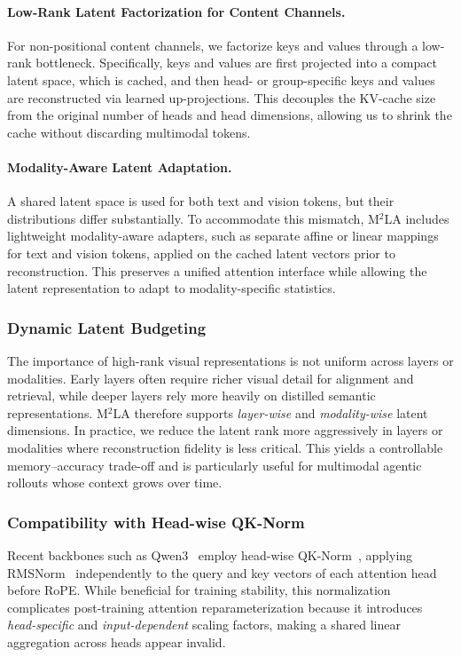 \documentclass[11pt, letterpaper]{template}
\theoremstyle{plain}
\theoremstyle{definition}
\theoremstyle{remark}
\begin{document}
\paragraph{Low-Rank Latent Factorization for Content Channels.}
For non-positional content channels, we factorize keys and values through a low-rank bottleneck. Specifically, keys and values are first projected into a compact latent space, which is cached, and then head- or group-specific keys and values are reconstructed via learned up-projections. This decouples the KV-cache size from the original number of heads and head dimensions, allowing us to shrink the cache without discarding multimodal tokens.

\paragraph{Modality-Aware Latent Adaptation.}
A shared latent space is used for both text and vision tokens, but their distributions differ substantially. To accommodate this mismatch, M$^2$LA includes lightweight modality-aware adapters, such as separate affine or linear mappings for text and vision tokens, applied on the cached latent vectors prior to reconstruction. This preserves a unified attention interface while allowing the latent representation to adapt to modality-specific statistics.

\subsubsection{Dynamic Latent Budgeting}

The importance of high-rank visual representations is not uniform across layers or modalities. Early layers often require richer visual detail for alignment and retrieval, while deeper layers rely more heavily on distilled semantic representations. M$^2$LA therefore supports \emph{layer-wise} and \emph{modality-wise} latent dimensions. In practice, we reduce the latent rank more aggressively in layers or modalities where reconstruction fidelity is less critical. This yields a controllable memory--accuracy trade-off and is particularly useful for multimodal agentic rollouts whose context grows over time.

\subsubsection{Compatibility with Head-wise QK-Norm}

Recent backbones such as Qwen3~\citep{yang2025qwen3} employ head-wise QK-Norm~\citep{henry2020query}, applying RMSNorm~\citep{zhang2019root} independently to the query and key vectors of each attention head before RoPE. While beneficial for training stability, this normalization complicates post-training attention reparameterization because it introduces \emph{head-specific} and \emph{input-dependent} scaling factors, making a shared linear aggregation across heads appear invalid.
\end{document}
